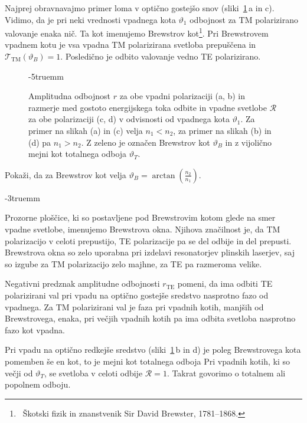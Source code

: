 Najprej obravnavajmo primer loma v optično gostejšo snov 
(sliki~\ref{fig:Brewster}\,a in c). Vidimo, da je pri neki vrednosti vpadnega kota $\vartheta_1$ odbojnost za 
TM polarizirano valovanje enaka nič. Ta kot imenujemo Brewstrov 
kot\footnote{~Škotski fizik in znanstvenik Sir David Brewster, 1781--1868.}. 
Pri Brewstrovem vpadnem kotu je vsa vpadna TM polarizirana svetloba prepuščena
in $\mathcal{T}_\mathrm{TM}(\vartheta_B)=1$. Posledično je odbito valovanje vedno TE
polarizirano. 
\begin{figure}[ht]
\centering
  \def\svgwidth{135truemm} 
  
\caption{Amplitudna odbojnost $r$ za obe vpadni polarizaciji (a, b) in razmerje med 
gostoto energijskega toka odbite in vpadne svetlobe $\mathcal{R}$ za obe polarizaciji (c, d)
v odvisnosti od vpadnega kota $\vartheta_1$. Za primer na slikah (a) in (c) velja $n_1<n_2$, za primer na 
slikah (b) in (d) pa $n_1>n_2$. Z zeleno je označen Brewstrov kot $\vartheta_B$ in
z vijolično mejni kot totalnega odboja $\vartheta_T$.}
\label{fig:Brewster}
\vglue-5truemm
\end{figure}

\begin{definition}
Pokaži, da za Brewstrov kot velja 
$\vartheta_{B}=\arctan\left(\frac{n_2}{n_1}\right)\!.$
\label{eq:Brew}
\end{definition}
\vglue-3truemm
\begin{remark}
Prozorne ploščice, ki so postavljene pod Brewstrovim kotom glede na smer vpadne svetlobe, 
imenujemo Brewstrova okna. Njihova značilnost je,
da TM polarizacijo v celoti prepustijo, TE polarizacije pa se del odbije in  
del prepusti. Brewstrova okna so zelo uporabna pri izdelavi resonatorjev 
plinskih laserjev, saj so izgube za TM polarizacijo zelo majhne, 
za TE pa razmeroma velike.  
\end{remark}

Negativni predznak amplitudne odbojnosti $r_{\mathrm{TE}}$ pomeni, da ima odbiti TE 
polarizirani val pri vpadu na optično gostejše sredstvo nasprotno 
fazo od vpadnega. Za TM polarizirani val je faza pri vpadnih kotih, manjših od Brewstrovega, 
enaka, pri večjih vpadnih kotih pa ima odbita svetloba nasprotno fazo kot vpadna. 

Pri vpadu na optično redkejše sredstvo (sliki~\ref{fig:Brewster}\,b in d) je poleg Brewstrovega kota
pomemben še en kot, to je mejni kot totalnega odboja
Pri vpadnih kotih, ki so večji od $\vartheta_T$, se svetloba v celoti odbije 
$\mathcal{R}=1$. Takrat govorimo
o totalnem ali popolnem odboju. 


